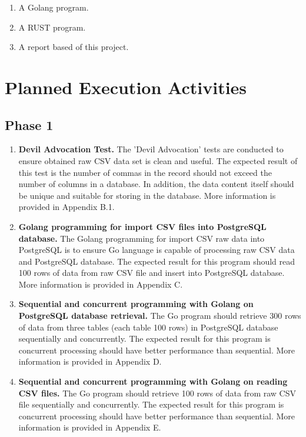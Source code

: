 \begin{enumerate}[topsep=0pt,itemsep=-1ex,partopsep=1ex,parsep=1ex]
\item A Golang program. 
\item A RUST program.
\item A report based of this project. 
\end{enumerate}

\section{Planned Execution Activities}

\subsection{Phase 1}

\begin{enumerate}[topsep=0pt,itemsep=-1ex,partopsep=1ex,parsep=1.5ex]
	
	\item \textbf{Devil Advocation Test.}
	 The 'Devil Advocation' tests are conducted to ensure obtained raw CSV data set is clean and useful. The expected result of this test is the number of commas in the record should not exceed the number of columns in a database. In addition, the data content itself should be unique and suitable for storing in the database. More information is provided in Appendix B.1.
		
	\item \textbf{Golang programming for import CSV files into PostgreSQL database.}
	The Golang programming for import CSV raw data into PostgreSQL is to ensure Go language is capable of processing raw CSV data and PostgreSQL database. The expected result for this program should read 100 rows of data from raw CSV file and insert into PostgreSQL database. More information is provided in Appendix C.
	\pagebreak
	
	\item \textbf{Sequential and concurrent programming with Golang on PostgreSQL database retrieval.}
    The Go program should retrieve 300 rows of data from three tables (each table 100 rows) in PostgreSQL database sequentially and concurrently. The expected result for this program is concurrent processing should have better performance than sequential. More information is provided in Appendix D.	
	
	\item \textbf{Sequential and concurrent programming with Golang on reading CSV files.}
	The Go program should retrieve 100 rows of data from raw CSV file sequentially and concurrently. The expected result for this program is concurrent processing should have better performance than sequential. More information is provided in Appendix E.
	 
\end{enumerate}

